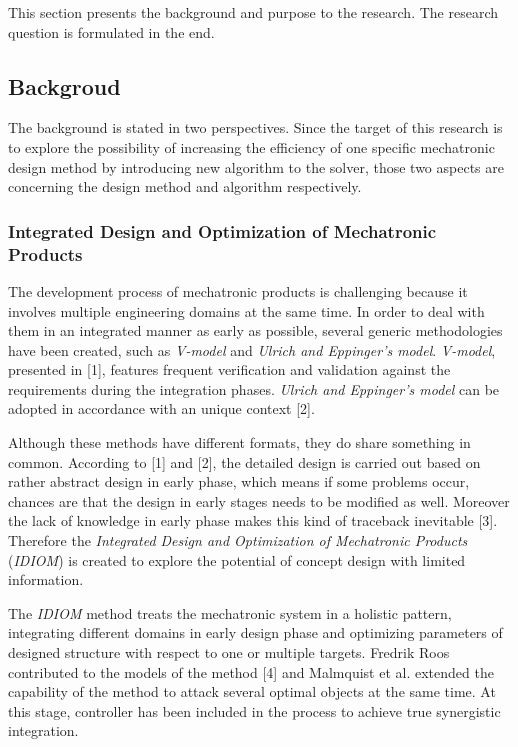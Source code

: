 This section presents the background and purpose to the research. The research question is formulated in the end.

\subsection{Backgroud}
The background is stated in two perspectives. Since the target of this research is to explore the possibility of increasing the efficiency of one specific mechatronic design method by introducing new algorithm to the solver, those two aspects are concerning the design method and algorithm respectively.

\subsubsection{Integrated Design and Optimization of Mechatronic Products}
The development process of mechatronic products is challenging because it involves multiple engineering domains at the same time. In order to deal with them in an integrated manner as early as possible, several generic methodologies have been created, such as \textit{V-model} and \textit{Ulrich and Eppinger's model}. \textit{V-model}, presented in [1], features frequent verification and validation against the requirements during the integration phases. \textit{Ulrich and Eppinger's model} can be adopted in accordance with an unique context [2].

Although these methods have different formats, they do share something in common. According to [1] and [2], the detailed design is carried out based on rather abstract design in early phase, which means if some problems occur, chances are that the design in early stages needs to be modified as well. Moreover the lack of knowledge in early phase makes this kind of traceback inevitable [3]. Therefore the \textit{Integrated Design and Optimization of Mechatronic Products} (\textit{IDIOM}) is created to explore the potential of concept design with limited information.

The \textit{IDIOM} method treats the mechatronic system in a holistic pattern,  integrating different domains in early design phase and optimizing parameters of designed structure with respect to one or multiple targets. Fredrik Roos contributed to the models of the method [4] and Malmquist et al. extended the capability of the method to attack several optimal objects at the same time. At this stage, controller has been included in the process to achieve true synergistic integration.

